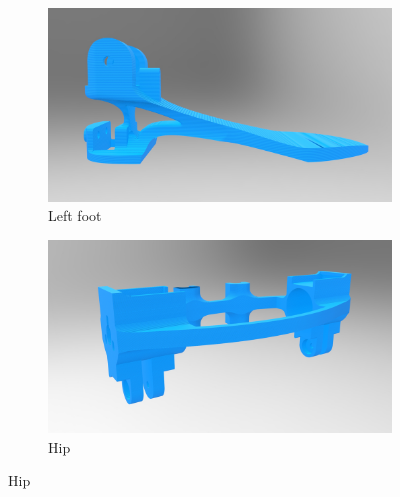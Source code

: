 \begin{figure}[ht!]
    \centering
    \begin{subfigure}[b]{0.49\textwidth}
        \includegraphics[width=\textwidth]{figures/legs_foot.jpg}
        \caption{Left foot}
        \label{fig:left_foot}
    \end{subfigure}
    \begin{subfigure}[b]{0.49\textwidth}
        \includegraphics[width=\textwidth]{figures/legs_hip.jpg}
        \caption{Hip}
        \label{fig:hip}
    \end{subfigure}
\end{figure}    

